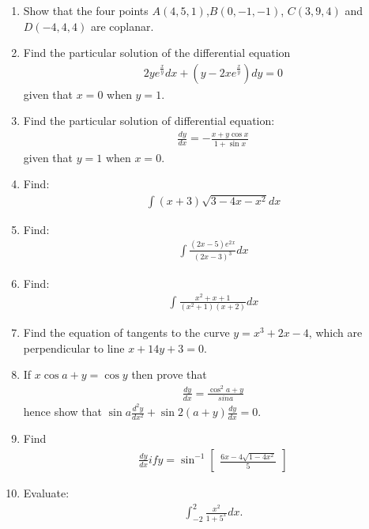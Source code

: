 \documentclass[12pt,-letter paper]{article}
\providecommand{\myvec}[1]{\ensuremath{\begin{bmatrix}#1\end{bmatrix}}}
\providecommand{\brak}[1]{\ensuremath{\left(#1\right)}}
\begin{document}
\begin{enumerate}
	\item Show that the four points $A\brak{4,5,1}$,$B\brak{0,-1,-1}$, $C\brak{3,9,4}$ and $D\brak{-4,4,4}$ are coplanar.



	\item Find the particular solution of the differential equation\begin{align*}2ye^\frac{x}{y}dx+\brak{{y-2xe^\frac{x}{y}}}dy=0 \end{align*} given that $x=0$  when $y=1$.		




		\item Find the particular solution of differential equation:\begin{align*} \frac{dy}{dx}=-\frac{x+y\cos x}{1+\sin x} \end{align*} given that $y=1$ when $x=0$. 


\item Find:\begin{align*}\int{\brak{x+3}}\sqrt{3-4x-x^2}dx
\end{align*}



\item Find:\begin{align*}\int\frac{\brak{2x-5}e^2{}^x}{\brak{2x-3}^3}dx \end{align*}


	\item Find:\begin{align*}\int\frac{x^2+x+1}{\brak{x^2+1}\brak{x+2}}dx \end{align*}


  \item Find the equation of tangents to the curve $y=x^3+2x-4$, which are perpendicular to line $x+14y+3=0$.
		  
  \item If $x\cos{a+y}=\cos{y}$ then prove that \begin{align*}\frac{dy}{dx}=\frac{\cos^2 a+y}{sina} \end{align*}
	  hence show that $\sin a\frac{d^{2}y}{dx^2}+\sin2\brak{a+y}\frac{dy}{dx}=0$.

   
  \item Find \begin{align*}\frac{dy}{dx} if y=\sin^{-1}\myvec{\frac{6x-4\sqrt{1-4x^2}}{5}} \end{align*}



	  \item Evaluate:\begin{align*}\int_{-2}^{2}\frac{x^2}{1+5^x}dx. \end{align*}


\end{enumerate}
\end{document}
